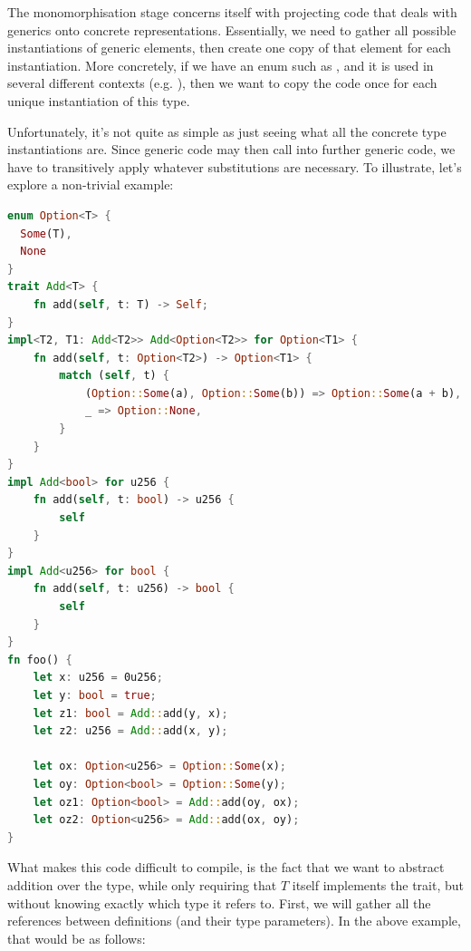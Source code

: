 The monomorphisation stage concerns itself with projecting code that deals with generics onto concrete representations. Essentially, we need to gather all possible instantiations of generic elements, then create one copy of that element for each instantiation. More concretely, if we have an enum such as , and it is used in several different contexts (e.g. ), then we want to copy the code once for each unique instantiation of this type. \par
Unfortunately, it's not quite as simple as just seeing what all the concrete type instantiations are. Since generic code may then call into further generic code, we have to transitively apply whatever substitutions are necessary. To illustrate, let's explore a non-trivial example:
\begin{lstlisting}[language=Rust, style=boxed]
enum Option<T> {
  Some(T),
  None
}
trait Add<T> {
    fn add(self, t: T) -> Self;
}
impl<T2, T1: Add<T2>> Add<Option<T2>> for Option<T1> {
    fn add(self, t: Option<T2>) -> Option<T1> {
        match (self, t) {
            (Option::Some(a), Option::Some(b)) => Option::Some(a + b),
            _ => Option::None,
        }
    }
}
impl Add<bool> for u256 {
    fn add(self, t: bool) -> u256 {
        self
    }
}
impl Add<u256> for bool {
    fn add(self, t: u256) -> bool {
        self
    }
}
fn foo() {
    let x: u256 = 0u256;
    let y: bool = true;
    let z1: bool = Add::add(y, x);
    let z2: u256 = Add::add(x, y);

    let ox: Option<u256> = Option::Some(x);
    let oy: Option<bool> = Option::Some(y);
    let oz1: Option<bool> = Add::add(oy, ox);
    let oz2: Option<u256> = Add::add(ox, oy);
}
\end{lstlisting}
What makes this code difficult to compile, is the fact that we want to abstract addition over the  type, while only requiring that $T$ itself implements the  trait, but without knowing exactly which type it refers to. First, we will gather all the references between definitions (and their type parameters). In the above example, that would be as follows:

